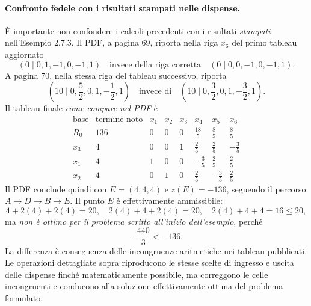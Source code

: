 \paragraph{Confronto fedele con i risultati stampati nelle dispense.}
È importante non confondere i calcoli precedenti con i risultati \emph{stampati} nell'Esempio 2.7.3. Il PDF, a pagina 69, riporta nella riga $x_6$ del primo tableau aggiornato
\[
\left(0\mid0,1,-1,0,-1,1\right)
\quad\text{invece della riga corretta}\quad
\left(0\mid0,0,-1,0,-1,1\right).
\]
A pagina 70, nella stessa riga del tableau successivo, riporta
\[
\left(10\mid0,\frac52,0,1,-\frac12,1\right)
\quad\text{invece di}\quad
\left(10\mid0,\frac32,0,1,-\frac32,1\right).
\]
Il tableau finale \emph{come compare nel PDF} è
\[
\begin{array}{c|r|rrrrrr}
\text{base}&\text{termine noto}&x_1&x_2&x_3&x_4&x_5&x_6\\\hline
R_0&136&0&0&0&\frac{18}{5}&\frac85&\frac85\\\hline
x_3&4&0&0&1&\frac25&\frac25&-\frac35\\
x_1&4&1&0&0&-\frac35&\frac25&\frac25\\
x_2&4&0&1&0&\frac25&-\frac35&\frac25
\end{array}
\]
Il PDF conclude quindi con $E=(4,4,4)$ e $z(E)=-136$, seguendo il percorso $A\to D\to B\to E$. Il punto $E$ è effettivamente ammissibile:
\[
4+2(4)+2(4)=20,\quad
2(4)+4+2(4)=20,\quad
2(4)+4+4=16\le20,
\]
ma \emph{non è ottimo per il problema scritto all'inizio dell'esempio}, perché
\[
-\frac{440}{3}<-136.
\]
La differenza è conseguenza delle incongruenze aritmetiche nei tableau pubblicati. Le operazioni dettagliate sopra riproducono le stesse scelte di ingresso e uscita delle dispense finché matematicamente possibile, ma correggono le celle incongruenti e conducono alla soluzione effettivamente ottima del problema formulato.

\newpage

